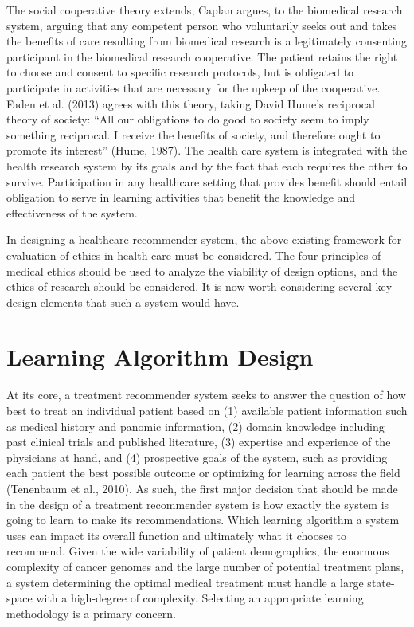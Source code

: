 \documentclass[]{spie}  %
\begin{document}
The social cooperative theory extends, Caplan argues, to the biomedical research system, arguing that any competent person who voluntarily seeks out and takes the benefits of care resulting from biomedical research is a legitimately consenting participant in the biomedical research cooperative. The patient retains the right to choose and consent to specific research protocols, but is obligated to participate in activities that are necessary for the upkeep of the cooperative. Faden et al. (2013) agrees with this theory, taking David Hume’s reciprocal theory of society: “All our obligations to do good to society seem to imply something reciprocal. I receive the benefits of society, and therefore ought to promote its interest” (Hume, 1987). The health care system is integrated with the health research system by its goals and by the fact that each requires the other to survive. Participation in any healthcare setting that provides benefit should entail obligation to serve in learning activities that benefit the knowledge and effectiveness of the system.

In designing a healthcare recommender system, the above existing framework for evaluation of ethics in health care must be considered. The four principles of medical ethics should be used to analyze the viability of design options, and the ethics of research should be considered. It is now worth considering several key design elements that such a system would have.


\section{Learning Algorithm Design}

At its core, a treatment recommender system seeks to answer the question of how best to treat an individual patient based on (1) available patient information such as medical history and panomic information, (2) domain knowledge including past clinical trials and published literature, (3) expertise and experience of the physicians at hand, and (4) prospective goals of the system, such as providing each patient the best possible outcome or optimizing for learning across the field (Tenenbaum et al., 2010). As such, the first major decision that should be made in the design of a treatment recommender system is how exactly the system is going to learn to make its recommendations. Which learning algorithm a system uses can impact its overall function and ultimately what it chooses to recommend. Given the wide variability of patient demographics, the enormous complexity of cancer genomes and the large number of potential treatment plans, a system determining the optimal medical treatment must handle a large state-space with a high-degree of complexity. Selecting an appropriate learning methodology is a primary concern.
\end{document}
